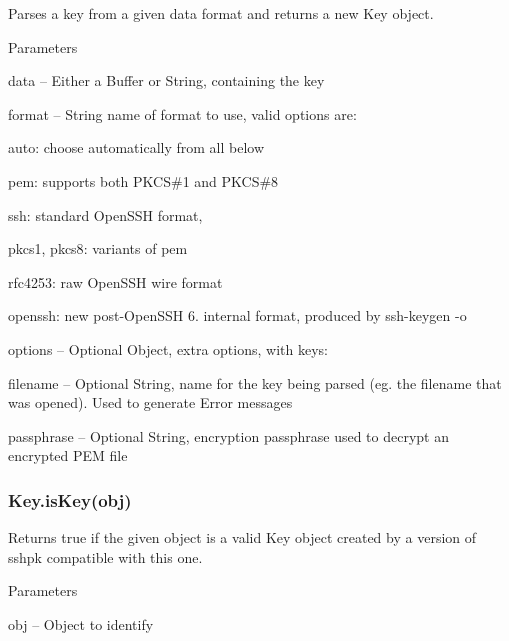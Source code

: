 Parses a key from a given data format and returns a new {\ttfamily Key} object.

Parameters


\begin{DoxyItemize}
\item {\ttfamily data} -- Either a Buffer or String, containing the key
\item {\ttfamily format} -- String name of format to use, valid options are\+:
\begin{DoxyItemize}
\item {\ttfamily auto}\+: choose automatically from all below
\item {\ttfamily pem}\+: supports both P\+K\+CS\#1 and P\+K\+CS\#8
\item {\ttfamily ssh}\+: standard Open\+S\+SH format,
\item {\ttfamily pkcs1}, {\ttfamily pkcs8}\+: variants of {\ttfamily pem}
\item {\ttfamily rfc4253}\+: raw Open\+S\+SH wire format
\item {\ttfamily openssh}\+: new post-\/\+Open\+S\+SH 6. internal format, produced by {\ttfamily ssh-\/keygen -\/o}
\end{DoxyItemize}
\item {\ttfamily options} -- Optional Object, extra options, with keys\+:
\begin{DoxyItemize}
\item {\ttfamily filename} -- Optional String, name for the key being parsed (eg. the filename that was opened). Used to generate Error messages
\item {\ttfamily passphrase} -- Optional String, encryption passphrase used to decrypt an encrypted P\+EM file
\end{DoxyItemize}
\end{DoxyItemize}

\subsubsection*{{\ttfamily Key.\+is\+Key(obj)}}

Returns {\ttfamily true} if the given object is a valid {\ttfamily Key} object created by a version of {\ttfamily sshpk} compatible with this one.

Parameters


\begin{DoxyItemize}
\item {\ttfamily obj} -- Object to identify
\end{DoxyItemize}

